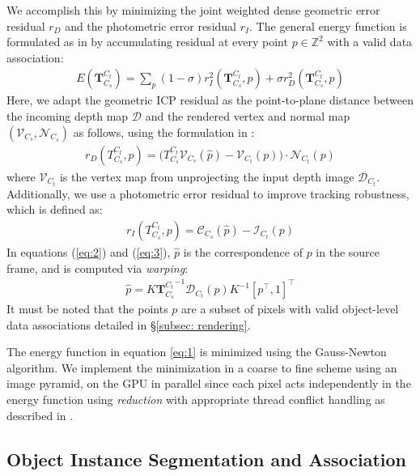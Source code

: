 We accomplish this by minimizing the joint weighted dense geometric error residual $r_D$ and the photometric error residual $r_I$. The general energy function is formulated as in \cite{parkColoredPointCloud2017} by accumulating residual at every point $p \in \mathbb{Z}^2$ with a valid data association:
\begin{align}
    E(\mathbf{T}^{C_t}_{C_{s}}) = \sum_{p} (1 - \sigma) r_I^2(\mathbf{T}^{C_t}_{C_s}, p) + \sigma r_D^2(\mathbf{T}^{C_t}_{C_s}, p) \label{eq:1}
\end{align}
Here, we adapt the geometric ICP residual as the point-to-plane distance between the incoming depth map $\mathcal{D}$ and the rendered vertex and normal map $(\mathcal{V}_{C_s}, \mathcal{N}_{C_s})$ as follows, using the formulation in \cite{newcombeKinectFusionRealtimeDense2011}:
\begin{align}
    r_D(T^{C_t}_{C_s}, p) = \bigg(T^{C_t}_{C_{s}} \mathcal{V}_{C_s}( \hat{p} ) - \mathcal{V}_{C_{t}}(p )\bigg) \cdot \mathcal{N}_{C_{t}}( p ) \label{eq:2}
\end{align}
where $\mathcal{V}_{C_t}$ is the vertex map from unprojecting the input depth image $\mathcal{D}_{C_t}$.
Additionally, we use a photometric error residual to improve tracking robustness, which is defined as:
\begin{align}
    r_I(T^{C_t}_{C_s}, p) = \mathcal{C}_{C_s}(\hat{p}) - \mathcal{I}_{C_t}(p) \label{eq:3}
\end{align}
In equations (\ref{eq:2}) and (\ref{eq:3}), $\hat{p}$ is the correspondence of $p$ in the source frame, and is computed via \textit{warping}:
\begin{align}
    \hat{p} = K {\mathbf{T}^{C_t}_{C_s}}^{-1}\mathcal{D}_{C_t}(p)K^{-1}[p^\top, 1]^\top \label{eq:4}
\end{align}
It must be noted that the points $p$ are a subset of pixels with valid object-level data associations detailed in \S\ref{subsec: rendering}.

The energy function in equation \ref{eq:1} is minimized using the Gauss-Newton algorithm. We implement the minimization in a coarse to fine scheme using an image pyramid, on the GPU in parallel since each pixel acts independently in the energy function using \textit{reduction} with appropriate thread conflict handling as described in \cite{dongGPUAcceleratedRobust2019}.

\subsection{Object Instance Segmentation and Association} \label{subsec: segmentation}

